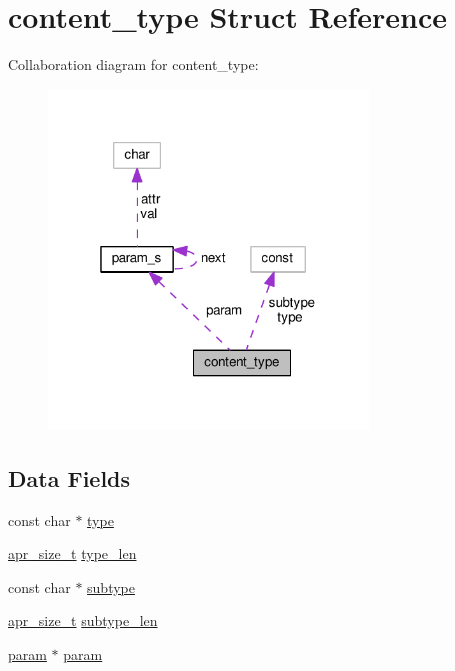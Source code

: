 \hypertarget{structcontent__type}{}\section{content\+\_\+type Struct Reference}
\label{structcontent__type}


Collaboration diagram for content\+\_\+type\+:
\nopagebreak
\begin{figure}[H]
\begin{center}
\leavevmode
\includegraphics[width=241pt]{structcontent__type__coll__graph}
\end{center}
\end{figure}
\subsection*{Data Fields}
\begin{DoxyCompactItemize}
\item 
const char $\ast$ \hyperlink{structcontent__type_a738b2fb8e2906be2ccb198f0e0cbc552}{type}
\item 
\hyperlink{group__apr__platform_gaaa72b2253f6f3032cefea5712a27540e}{apr\+\_\+size\+\_\+t} \hyperlink{structcontent__type_ae68ee0d2e0cc359c21a52c388d2d477d}{type\+\_\+len}
\item 
const char $\ast$ \hyperlink{structcontent__type_a2c5fa0b72d7aca1db3ac831182908f59}{subtype}
\item 
\hyperlink{group__apr__platform_gaaa72b2253f6f3032cefea5712a27540e}{apr\+\_\+size\+\_\+t} \hyperlink{structcontent__type_ae4169ff6830eb7736bc8d9af3d277e26}{subtype\+\_\+len}
\item 
\hyperlink{mod__mime_8c_a5c0eef538232854ead9eb8af12c04938}{param} $\ast$ \hyperlink{structcontent__type_a949b9a296f4572aa6f97a54b9b5770a1}{param}
\end{DoxyCompactItemize}


